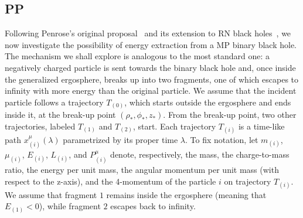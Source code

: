 \subsection{PP}

Following Penrose's original proposal~\cite{PENROSE1971} and its extension to RN black holes~\cite{RUFFINI1971,DENARDO1973}, we now investigate the possibility of energy extraction from a MP binary black hole. The mechanism we shall explore is analogous to the most standard one: a negatively charged particle is sent towards the binary black hole and, once inside the generalized ergosphere, breaks up into two fragments, one of which escapes to infinity with more energy than the original particle. We assume that the incident particle follows a trajectory $T_{(0)}$, which starts outside the ergosphere and ends inside it, at the break-up point $(\rho_*,\phi_*,z_*)$. From the break-up point, two other trajectories, labeled $T_{(1)}$ and $T_{(2)}$, start. Each trajectory $T_{(i)}$ is a time-like path $x^{\mu}_{(i)}(\lambda)$ parametrized by its proper time $\lambda$. To fix notation, let $m_{(i)}$, $\mu_{(i)}$, $E_{(i)}$, $L_{(i)}$, and $P^{\mu}_{(i)}$ denote, respectively, the mass, the charge-to-mass ratio, the energy per unit mass, the angular momentum per unit mass (with respect to the z-axis), and the 4-momentum of the particle $i$ on trajectory $T_{(i)}$. We assume that fragment $1$ remains inside the ergosphere (meaning that $E_{(1)} < 0 $), while fragment $2$ escapes back to infinity.

